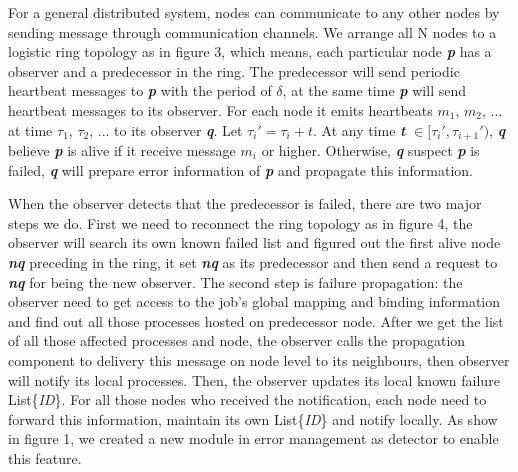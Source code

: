 \documentclass[sigconf]{acmart}
\begin{document}
For a general distributed system, nodes can communicate to any other nodes by sending message through communication channels. We arrange all N nodes to a logistic ring topology as in figure 3, which means, each particular node \textbf{\textit{p}} has a observer and a predecessor in the ring. The predecessor will send periodic heartbeat messages to \textbf{\textit{p}} with the period of $\delta$, at the same time \textbf{\textit{p}} will send heartbeat messages to its observer. For each node it emits heartbeats $m_1$, $m_2$, ... at time $\tau_1$, $\tau_2$, ... to its observer \textbf{\textit{q}}. Let $\tau_i' = \tau_i + t$. At any time \textbf{\textit{t}} $\in [\tau_i', \tau_{i+1}')$, \textbf{\textit{q}} believe \textbf{\textit{p}} is alive if it receive message $m_i$ or higher. Otherwise, \textbf{\textit{q}} suspect \textbf{\textit{p}} is failed, \textbf{\textit{q}} will prepare error information of \textbf{\textit{p}} and propagate this information. 

When the observer detects that the predecessor is failed, there are two major steps we do. First we need to reconnect the ring topology as in figure 4, the observer will search its own known failed list and figured out the first alive node \textbf{\textit{nq}} preceding in the ring, it set \textbf{\textit{nq}} as its predecessor and then send a request to \textbf{\textit{nq}} for being the new observer. The second step is failure propagation: the observer need to get access to the job's global mapping and binding information and find out all those processes hosted on predecessor node. After we get the list of all those affected processes and node, the observer calls the propagation component to delivery this message on node level to its neighbours, then observer will notify its local processes. Then, the observer updates its local known failure List\{\textit{ID}\}. For all those nodes who received the notification, each node need to forward this information, maintain its own List\{\textit{ID}\} and notify locally. As show in figure 1, we created a new module in error management as detector to enable this feature.
\end{document}
